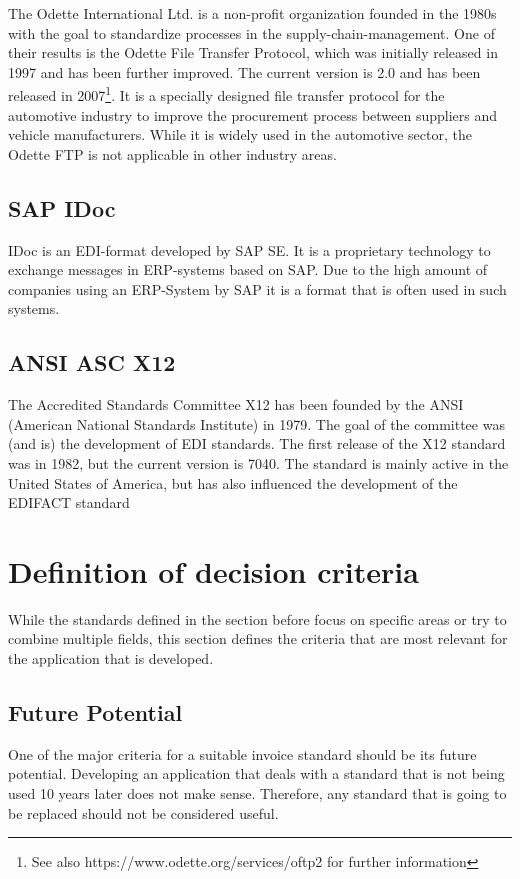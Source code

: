 The Odette International Ltd. is a non-profit organization founded in the 1980s with the goal to standardize processes in the supply-chain-management. One of their results is the Odette File Transfer Protocol, which was initially released in 1997 and has been further improved. The current version is 2.0 and has been released in 2007\footnote{See also https://www.odette.org/services/oftp2 for further information}. It is a specially designed file transfer protocol for the automotive industry to improve the procurement process between suppliers and vehicle manufacturers. While it is widely used in the automotive sector, the Odette FTP is not applicable in other industry areas.

\subsection{SAP IDoc}
\label{sec2.1.6}

IDoc is an EDI-format developed by SAP SE. It is a proprietary technology to exchange messages in ERP-systems based on SAP. Due to the high amount of companies using an ERP-System by SAP it is a format that is often used in such systems.

\subsection{ANSI ASC X12}
\label{sec2.1.7}

The Accredited Standards Committee X12 has been founded by the ANSI (American National Standards Institute) in 1979. The goal of the committee was (and is) the development of EDI standards. The first release of the X12 standard was in 1982, but the current version is 7040. The standard is mainly active in the United States of America, but has also influenced the development of the EDIFACT standard

\section{Definition of decision criteria}
\label{sec2.2}

While the standards defined in the section before focus on specific areas or try to combine multiple fields, this section defines the criteria that are most relevant for the application that is developed.

\subsection{Future Potential}
\label{sec2.2.1}
One of the major criteria for a suitable invoice standard should be its future potential. Developing an application that deals with a standard that is not being used 10 years later does not make sense. Therefore, any standard that is going to be replaced should not be considered useful.

